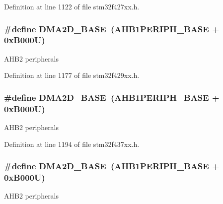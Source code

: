 Definition at line 1122 of file stm32f427xx.\+h.

\subsubsection[{\texorpdfstring{D\+M\+A2\+D\+\_\+\+B\+A\+SE}{DMA2D_BASE}}]{\setlength{\rightskip}{0pt plus 5cm}\#define D\+M\+A2\+D\+\_\+\+B\+A\+SE~({\bf A\+H\+B1\+P\+E\+R\+I\+P\+H\+\_\+\+B\+A\+SE} + 0x\+B000\+U)}\hypertarget{group___peripheral__memory__map_gacec66385fd1604e69584eb19a0aaa303}{}\label{group___peripheral__memory__map_gacec66385fd1604e69584eb19a0aaa303}
A\+H\+B2 peripherals 

Definition at line 1177 of file stm32f429xx.\+h.

\subsubsection[{\texorpdfstring{D\+M\+A2\+D\+\_\+\+B\+A\+SE}{DMA2D_BASE}}]{\setlength{\rightskip}{0pt plus 5cm}\#define D\+M\+A2\+D\+\_\+\+B\+A\+SE~({\bf A\+H\+B1\+P\+E\+R\+I\+P\+H\+\_\+\+B\+A\+SE} + 0x\+B000\+U)}\hypertarget{group___peripheral__memory__map_gacec66385fd1604e69584eb19a0aaa303}{}\label{group___peripheral__memory__map_gacec66385fd1604e69584eb19a0aaa303}
A\+H\+B2 peripherals 

Definition at line 1194 of file stm32f437xx.\+h.

\subsubsection[{\texorpdfstring{D\+M\+A2\+D\+\_\+\+B\+A\+SE}{DMA2D_BASE}}]{\setlength{\rightskip}{0pt plus 5cm}\#define D\+M\+A2\+D\+\_\+\+B\+A\+SE~({\bf A\+H\+B1\+P\+E\+R\+I\+P\+H\+\_\+\+B\+A\+SE} + 0x\+B000\+U)}\hypertarget{group___peripheral__memory__map_gacec66385fd1604e69584eb19a0aaa303}{}\label{group___peripheral__memory__map_gacec66385fd1604e69584eb19a0aaa303}
A\+H\+B2 peripherals 

